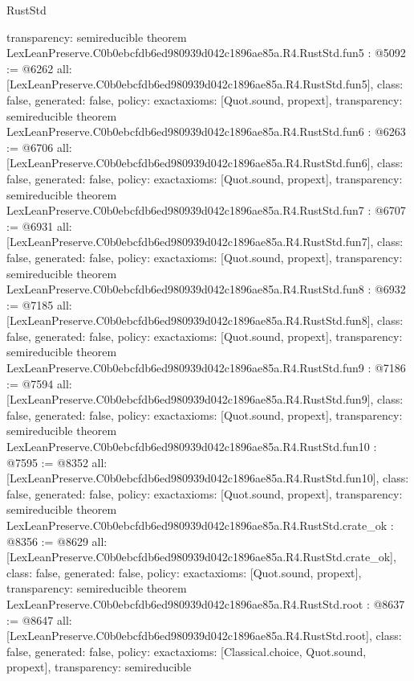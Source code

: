 \begin{lexlean}{RustStd}
\begin{coremodule}
{  transparency: semireducible
}
theorem LexLeanPreserve.C0b0ebcfdb6ed980939d042c1896ae85a.R4.RustStd.fun5 : @5092 := @6262 {
  all: [LexLeanPreserve.C0b0ebcfdb6ed980939d042c1896ae85a.R4.RustStd.fun5],
  class: false,
  generated: false,
  policy: exact{axioms: [Quot.sound, propext]},
  transparency: semireducible
}
theorem LexLeanPreserve.C0b0ebcfdb6ed980939d042c1896ae85a.R4.RustStd.fun6 : @6263 := @6706 {
  all: [LexLeanPreserve.C0b0ebcfdb6ed980939d042c1896ae85a.R4.RustStd.fun6],
  class: false,
  generated: false,
  policy: exact{axioms: [Quot.sound, propext]},
  transparency: semireducible
}
theorem LexLeanPreserve.C0b0ebcfdb6ed980939d042c1896ae85a.R4.RustStd.fun7 : @6707 := @6931 {
  all: [LexLeanPreserve.C0b0ebcfdb6ed980939d042c1896ae85a.R4.RustStd.fun7],
  class: false,
  generated: false,
  policy: exact{axioms: [Quot.sound, propext]},
  transparency: semireducible
}
theorem LexLeanPreserve.C0b0ebcfdb6ed980939d042c1896ae85a.R4.RustStd.fun8 : @6932 := @7185 {
  all: [LexLeanPreserve.C0b0ebcfdb6ed980939d042c1896ae85a.R4.RustStd.fun8],
  class: false,
  generated: false,
  policy: exact{axioms: [Quot.sound, propext]},
  transparency: semireducible
}
theorem LexLeanPreserve.C0b0ebcfdb6ed980939d042c1896ae85a.R4.RustStd.fun9 : @7186 := @7594 {
  all: [LexLeanPreserve.C0b0ebcfdb6ed980939d042c1896ae85a.R4.RustStd.fun9],
  class: false,
  generated: false,
  policy: exact{axioms: [Quot.sound, propext]},
  transparency: semireducible
}
theorem LexLeanPreserve.C0b0ebcfdb6ed980939d042c1896ae85a.R4.RustStd.fun10 : @7595 := @8352 {
  all: [LexLeanPreserve.C0b0ebcfdb6ed980939d042c1896ae85a.R4.RustStd.fun10],
  class: false,
  generated: false,
  policy: exact{axioms: [Quot.sound, propext]},
  transparency: semireducible
}
theorem LexLeanPreserve.C0b0ebcfdb6ed980939d042c1896ae85a.R4.RustStd.crate_ok : @8356 := @8629 {
  all: [LexLeanPreserve.C0b0ebcfdb6ed980939d042c1896ae85a.R4.RustStd.crate_ok],
  class: false,
  generated: false,
  policy: exact{axioms: [Quot.sound, propext]},
  transparency: semireducible
}
theorem LexLeanPreserve.C0b0ebcfdb6ed980939d042c1896ae85a.R4.RustStd.root : @8637 := @8647 {
  all: [LexLeanPreserve.C0b0ebcfdb6ed980939d042c1896ae85a.R4.RustStd.root],
  class: false,
  generated: false,
  policy: exact{axioms: [Classical.choice, Quot.sound, propext]},
  transparency: semireducible
}


\end{coremodule}
\end{lexlean}
